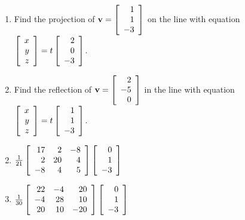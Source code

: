 \begin{multicols}{2}
\begin{ex}
\begin{enumerate}[label={\alph*.}]
\item Find the projection of 
$\textbf{v} = \left[
\begin{array}{r}
1\\
1\\
-3
\end{array}
\right]$
 on the line with equation 
 $\left[
 \begin{array}{r}
 x\\
 y\\
 z 
 \end{array}
 \right]
 = t
 \left[
 \begin{array}{r}
 2\\
 0\\
 -3 
 \end{array}
 \right]$.

\item Find the reflection of 
$\textbf{v} = \left[
\begin{array}{r}
2\\
-5\\
0 
\end{array}
\right]$
 in the line with equation 
 $\left[
 \begin{array}{r}
 x\\
 y\\
 z 
 \end{array}
 \right]
 = t
 \left[
 \begin{array}{r}
 1\\
 1\\
 -3
 \end{array}
 \right]$.

\end{enumerate}
\begin{sol}
\begin{enumerate}[label={\alph*.}]
\setcounter{enumi}{1}
\item 
$\tfrac{1}{21}\left[
\begin{array}{rrr}
	17 & 2 & -8\\
	2 & 20 & 4\\
	-8 & 4 & 5
\end{array}
\right]
\left[
\begin{array}{r}
0\\
1\\
-3
\end{array}
\right]$

\setcounter{enumi}{3}
\item  
$\tfrac{1}{30}\left[
\begin{array}{rrr}
22 & -4 & 20\\
-4 & 28 & 10\\
20 & 10 & -20
\end{array}
\right]
\left[
\begin{array}{r}
0\\
1\\
-3
\end{array}
\right]$


\end{enumerate}
\end{sol}
\end{ex}
\end{multicols}
